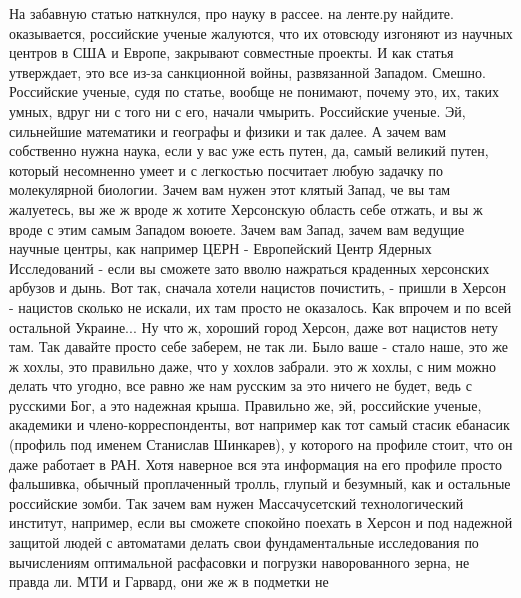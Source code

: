  
 
 
 
 



На забавную статью наткнулся, про науку в рассее. на ленте.ру найдите.
оказывается, российские ученые жалуются, что их отовсюду изгоняют из научных
центров в США и Европе, закрывают совместные проекты. И как статья утверждает,
это все из-за санкционной войны, развязанной Западом. Смешно. Российские
ученые, судя по статье, вообще не понимают, почему это, их, таких умных, вдруг
ни с того ни с его, начали чмырить. Российские ученые. Эй, сильнейшие
математики и географы и физики и так далее. А зачем вам собственно нужна наука,
если у вас уже есть путен, да, самый великий путен, который несомненно умеет и
 с легкостью посчитает любую задачку по
молекулярной биологии. Зачем вам нужен этот клятый Запад, че вы там жалуетесь,
вы же ж вроде ж хотите Херсонскую область себе отжать, и вы ж вроде с этим
самым Западом воюете.  Зачем вам Запад, зачем вам ведущие научные центры, как
например ЦЕРН - Европейский Центр Ядерных Исследований - если вы сможете зато
вволю нажраться краденных херсонских арбузов и дынь. Вот так, сначала хотели
нацистов почистить, - пришли в Херсон - нацистов сколько не искали, их там
просто не оказалось. Как впрочем и по всей остальной Украине... Ну что ж,
хороший город Херсон, даже вот нацистов нету там. Так давайте просто себе
заберем, не так ли. Было ваше - стало наше, это же ж хохлы, это правильно даже,
что у хохлов забрали. это ж хохлы, с ним можно делать что угодно, все равно же
нам русским за это ничего не будет, ведь с русскими Бог, а это надежная крыша.
Правильно же, эй, российские ученые, академики и члено-корреспонденты, вот
например как тот самый стасик ебанасик (профиль под именем Станислав Шинкарев),
у которого на профиле стоит, что он даже работает в РАН. Хотя наверное вся эта
информация на его профиле просто фальшивка, обычный проплаченный тролль, глупый
и безумный, как и остальные российские зомби. Так зачем вам нужен
Массачусетский технологический институт, например, если вы сможете спокойно
поехать в Херсон и под надежной защитой людей с автоматами делать свои
фундаментальные исследования по вычислениям оптимальной расфасовки и погрузки
наворованного зерна, не правда ли. МТИ и Гарвард, они же ж в подметки не
